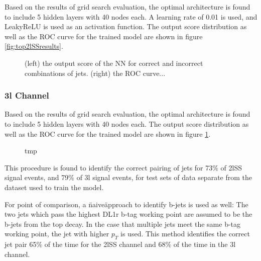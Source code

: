 Based on the results of grid search evaluation, the optimal architecture is found to include 5 hidden layers with 40 nodes each. A learning rate of 0.01 is used, and LeakyReLU is used as an activation function. The output score distribution as well as the ROC curve for the trained model are shown in figure \ref{fig:top2lSSresults}.

\begin{figure}
  \caption{(left) the output score of the NN for correct and incorrect combinations of jets. (right) the ROC curve...}
\end{figure}

\subsubsection{3l Channel}
\label{subsec:top3l}
 
Based on the results of grid search evaluation, the optimal architecture is found to include 5 hidden layers with 40 nodes each. The output score distribution as well as the ROC curve for the trained model are shown in figure \ref{fig:top3lresults}.

\begin{figure}                                                                                                           
   \label{fig:top3lresults}                                                                                               
   \caption{tmp}
\end{figure}

This procedure is found to identify the correct pairing of jets for 73\% of 2lSS signal events, and 79\% of 3l signal events, for test sets of data separate from the dataset used to train the model. 

For point of comparison, a \"naive\" approach to identify b-jets is used as well: The two jets which pass the highest DL1r b-tag working point are assumed to be the b-jets from the top decay. In the case that multiple jets meet the same b-tag working point, the jet with higher $p_T$ is used. This method identifies the correct jet pair 65\% of the time for the 2lSS channel and 68\% of the time in the 3l channel.  

